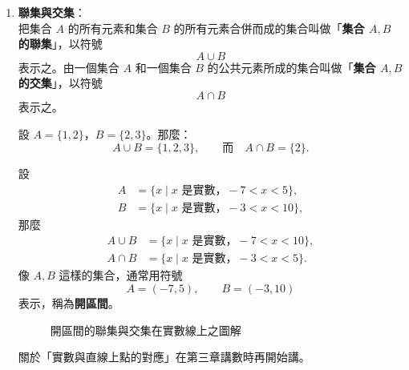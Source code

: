 \begin{enumerate}[(一)]
  \item \textbf{聯集與交集}：\\
  把集合 $A$ 的所有元素和集合 $B$ 的所有元素合併而成的集合叫做「\textbf{集合 $A, B$ 的聯集}」，以符號
  \begin{equation}\label{eq:union_def}
    A \cup B
  \end{equation}
  表示之。由一個集合 $A$ 和一個集合 $B$ 的公共元素所成的集合叫做「\textbf{集合 $A, B$ 的交集}」，以符號
  \begin{equation}\label{eq:intersection_def}
    A \cap B
  \end{equation}
  表示之。

  \begin{example}\label{ex:2-3-4}
  設 $A = \{1, 2\}$，$B = \{2, 3\}$。那麼：
  \begin{equation*}
    A \cup B = \{1, 2, 3\}, \qquad \text{而}\quad A \cap B = \{2\}.
  \end{equation*}
  \end{example}

  \begin{example}\label{ex:2-3-5}
  設 
  \begin{align*}
    A &= \{x \mid x \text{ 是實數，} -7 < x < 5\}, \\
    B &= \{x \mid x \text{ 是實數，} -3 < x < 10\},
  \end{align*}
  那麼
  \begin{align*}
    A \cup B &= \{x \mid x \text{ 是實數，} -7 < x < 10\}, \\
    A \cap B &= \{x \mid x \text{ 是實數，} -3 < x < 5\}.
  \end{align*}
  像 $A, B$ 這樣的集合，通常用符號
  \begin{equation*}
    A = (-7, 5), \qquad B = (-3, 10)
  \end{equation*}
  表示，稱為\textbf{開區間}。

  \begin{figure}[htbp]
  \centering
  \caption{開區間的聯集與交集在實數線上之圖解}\label{fig:open_intervals}
  \end{figure}
  關於「實數與直線上點的對應」在第三章講數時再開始講。
  \end{example}


\end{enumerate}
